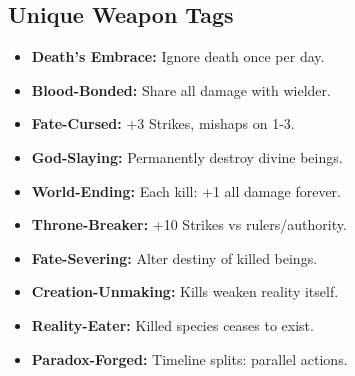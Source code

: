 \documentclass[10pt,twoside]{article}
\begin{document}
\vspace{0.5cm}

\subsection{Unique Weapon Tags}
\begin{minipage}[t]{0.48\textwidth}
\begin{itemize}[leftmargin=0.3cm, itemsep=0.1cm]
\item \textcolor{uniquecolor}{\textbf{Death's Embrace:}} \textcolor{uniquecolor}{Ignore death once per day.}
\item \textcolor{uniquecolor}{\textbf{Blood-Bonded:}} \textcolor{uniquecolor}{Share all damage with wielder.}
\item \textcolor{uniquecolor}{\textbf{Fate-Cursed:}} \textcolor{uniquecolor}{+3 Strikes, mishaps on 1-3.}
\item \textcolor{uniquecolor}{\textbf{God-Slaying:}} \textcolor{uniquecolor}{Permanently destroy divine beings.}
\item \textcolor{uniquecolor}{\textbf{World-Ending:}} \textcolor{uniquecolor}{Each kill: +1 all damage forever.}
\item \textcolor{uniquecolor}{\textbf{Throne-Breaker:}} \textcolor{uniquecolor}{+10 Strikes vs rulers/authority.}
\item \textcolor{uniquecolor}{\textbf{Fate-Severing:}} \textcolor{uniquecolor}{Alter destiny of killed beings.}
\item \textcolor{uniquecolor}{\textbf{Creation-Unmaking:}} \textcolor{uniquecolor}{Kills weaken reality itself.}
\item \textcolor{uniquecolor}{\textbf{Reality-Eater:}} \textcolor{uniquecolor}{Killed species ceases to exist.}
\item \textcolor{uniquecolor}{\textbf{Paradox-Forged:}} \textcolor{uniquecolor}{Timeline splits: parallel actions.}
\end{itemize}
\end{minipage}
\hfill
\end{document}
